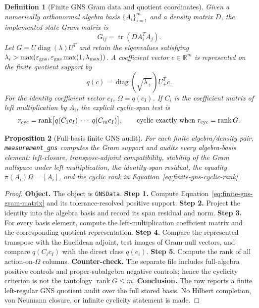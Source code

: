 \documentclass[11pt]{article}
\newtheorem{definition}{Definition}[section]
\newtheorem{proposition}[definition]{Proposition}
\theoremstyle{remark}
\newcommand{\code}[1]{\texttt{#1}}
\newcommand{\src}[1]{{\scriptsize\path{#1}}}
\numberwithin{equation}{section}
\begin{document}
\begin{definition}[Finite GNS Gram data and quotient coordinates]
Given a numerically orthonormal algebra basis \(\{A_i\}_{i=1}^m\) and a density matrix \(D\), the implemented state Gram matrix is
\begin{equation}
  G_{ij}=\operatorname{tr}(D A_i^T A_j).
  \label{eq:finite-gns-gram-matrix}
\end{equation}
Let \(G=U\operatorname{diag}(\lambda)U^T\) and retain the eigenvalues satisfying \(\lambda_i>\max(\varepsilon_{\rm gns},\varepsilon_{\rm gns}\max(1,\lambda_{\max}))\). A coefficient vector \(c\in\mathbb R^m\) is represented on the finite quotient support by
\[
  q(c)=\operatorname{diag}(\sqrt{\lambda_+})U_+^T c.
\]
For the identity coefficient vector \(c_I\), \(\Omega=q(c_I)\). If \(C_i\) is the coefficient matrix of left multiplication by \(A_i\), the explicit cyclic-span test is
\begin{equation}
  r_{\rm cyc}=\operatorname{rank}\bigl[q(C_1c_I)\;\cdots\;q(C_mc_I)\bigr],
  \qquad \text{cyclic exactly when }r_{\rm cyc}=\operatorname{rank}G.
  \label{eq:finite-gns-cyclic-rank}
\end{equation}
\end{definition}

\begin{proposition}[Full-basis finite GNS audit]
For each finite algebra/density pair, \code{measurement\_\allowbreak{}gns} computes the Gram support and audits every algebra-basis element: left-closure, transpose-adjoint compatibility, stability of the Gram nullspace under left multiplication, the identity-span residual, the equality \(\pi(A_i)\Omega=[A_i]\), and the cyclic rank in Equation~\eqref{eq:finite-gns-cyclic-rank}.
\end{proposition}
\begin{proof}
\textbf{Object.} The object is \code{GNSData}. \textbf{Step 1.} Compute Equation~\eqref{eq:finite-gns-gram-matrix} and its tolerance-resolved positive support. \textbf{Step 2.} Project the identity into the algebra basis and record its span residual and norm. \textbf{Step 3.} For every basis element, compute the left-multiplication coefficient matrix and the corresponding quotient representation. \textbf{Step 4.} Compare the represented transpose with the Euclidean adjoint, test images of Gram-null vectors, and compare \(q(C_ic_I)\) with the direct class \(q(e_i)\). \textbf{Step 5.} Compute the rank of all action-on-\(\Omega\) columns. \textbf{Counter-check.} The separate file \src{finite\_gns\_cyclicity\_controls.csv} includes full-algebra positive controls and proper-subalgebra negative controls; hence the cyclicity criterion is not the tautology \(\operatorname{rank}G\le m\). \textbf{Conclusion.} The row reports a finite left-regular GNS quotient audit over the full stored basis. No Hilbert completion, von Neumann closure, or infinite cyclicity statement is made.
\end{proof}
\end{document}

